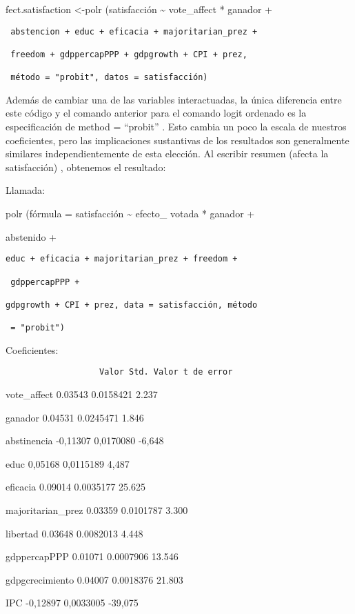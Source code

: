 \documentclass[
]{book}
\begin{document}
fect.satisfaction \textless-polr (satisfacción \textasciitilde{} vote\_affect * ganador +

\begin{verbatim}
 abstencion + educ + eficacia + majoritarian_prez +

 freedom + gdppercapPPP + gdpgrowth + CPI + prez,

 método = "probit", datos = satisfacción)
\end{verbatim}

Además de cambiar una de las variables interactuadas, la única diferencia entre este código y el comando anterior para el comando logit ordenado es la especificación de method = ``probit'' . Esto cambia un poco la escala de nuestros coeficientes, pero las implicaciones sustantivas de los resultados son generalmente similares independientemente de esta elección. Al escribir resumen (afecta la satisfacción) , obtenemos el resultado:

Llamada:

polr (fórmula = satisfacción \textasciitilde{} efecto\_ votada * ganador +

abstenido +

\begin{verbatim}
educ + eficacia + majoritarian_prez + freedom +

 gdppercapPPP +

gdpgrowth + CPI + prez, data = satisfacción, método

 = "probit")
\end{verbatim}

Coeficientes:

\begin{verbatim}
                   Valor Std. Valor t de error
\end{verbatim}

vote\_affect 0.03543 0.0158421 2.237

ganador 0.04531 0.0245471 1.846

abstinencia -0,11307 0,0170080 -6,648

educ 0,05168 0,0115189 4,487

eficacia 0.09014 0.0035177 25.625

majoritarian\_prez 0.03359 0.0101787 3.300

libertad 0.03648 0.0082013 4.448

gdppercapPPP 0.01071 0.0007906 13.546

gdpgcrecimiento 0.04007 0.0018376 21.803

IPC -0,12897 0,0033005 -39,075
\end{document}
